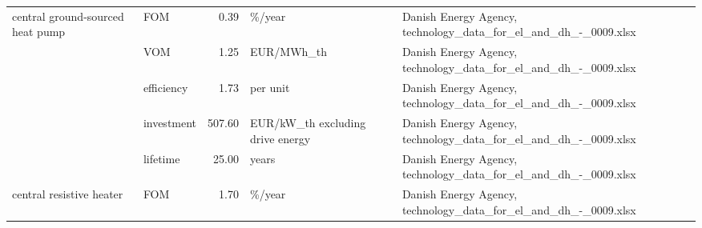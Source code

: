 \begin{longtable}{p{5cm}p{3cm}rp{3cm}p{11cm}}
central ground-sourced heat pump & FOM &           0.39 &                            \%/year &                                                                                                                                                                                                                                                                      Danish Energy Agency, technology\_data\_for\_el\_and\_dh\_-\_0009.xlsx \\
                      & VOM &           1.25 &                        EUR/MWh\_th &                                                                                                                                                                                                                                                                      Danish Energy Agency, technology\_data\_for\_el\_and\_dh\_-\_0009.xlsx \\
                      & efficiency &           1.73 &                          per unit &                                                                                                                                                                                                                                                                      Danish Energy Agency, technology\_data\_for\_el\_and\_dh\_-\_0009.xlsx \\
                      & investment &         507.60 &  EUR/kW\_th excluding drive energy &                                                                                                                                                                                                                                                                      Danish Energy Agency, technology\_data\_for\_el\_and\_dh\_-\_0009.xlsx \\
                      & lifetime &          25.00 &                             years &                                                                                                                                                                                                                                                                      Danish Energy Agency, technology\_data\_for\_el\_and\_dh\_-\_0009.xlsx \\
central resistive heater & FOM &           1.70 &                            \%/year &                                                                                                                                                                                                                                                                      Danish Energy Agency, technology\_data\_for\_el\_and\_dh\_-\_0009.xlsx \\

\end{longtable}
